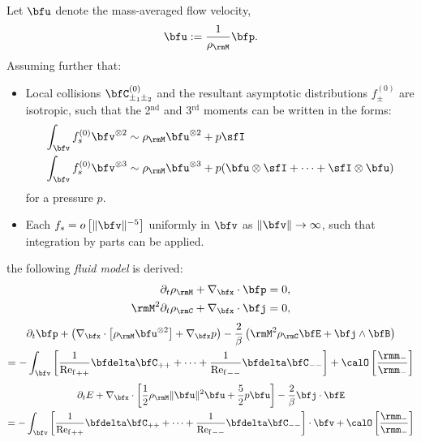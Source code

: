     Let $\bfu$ denote the mass-averaged flow velocity,
    \begin{equation}
        \bfu  :=  \frac{1}{\rho_{\rmM}}\bfp.
    \end{equation}
    Assuming further that:
    \begin{itemize}
        \item  Local collisions $\bfC_{\pm_{1}\pm_{2}}^{(0)}$ and the resultant asymptotic distributions $f_{\pm}^{(0)}$ are isotropic, such that the 2$^{\text{nd}}$ and 3$^{\text{rd}}$ moments can be written in the forms:
        \begin{align}
            \int_{\bfv}f_{s}^{(0)}\bfv^{\otimes 2}  &\sim  \rho_{\rmM}\bfu^{\otimes 2} + p\sfI  \label{eqn:isotropic 2nd moment}  \\
            \int_{\bfv}f_{s}^{(0)}\bfv^{\otimes 3}  &\sim  \rho_{\rmM}\bfu^{\otimes 3} + p(\bfu\otimes\sfI + \cdots + \sfI\otimes\bfu)  \label{eqn:isotropic 3rd moment}
        \end{align}
        for a pressure $p$. 
        \item  Each $f_{s}  =  o\left[\|\bfv\|^{- 5}\right]$ uniformly in $\bfv$ as $\|\bfv\|  \rightarrow  \infty$, such that integration by parts can be applied.
    \end{itemize}
    the following \emph{fluid model} is derived:
    \begin{align}
        \partial_{t}\rho_{\rmM} + \nabla_{\bfx}\cdot\bfp  &=  0,  \\
        \rmM^{2}\partial_{t}\rho_{\rmC} + \nabla_{\bfx}\cdot\bfj  &=  0,
    \end{align}
    \vspace{-25pt}
    \begin{multline}
        \partial_{t}\bfp + \left(\nabla_{\bfx}\cdot\left[\rho_{\rmM}\bfu^{\otimes 2}\right] + \nabla_{\bfx}p\right) - \frac{2}{\beta}\left(\rmM^{2}\rho_{\rmC}\bfE + \bfj\wedge\bfB\right)  \\
        =  - \int_{\bfv}\left[\frac{1}{{\rmRef}_{++}}\bfdelta\bfC_{++} + \cdots + \frac{1}{{\rmRef}_{--}}\bfdelta\bfC_{--}\right] + \calO\left[\frac{\rmm_{-}}{\rmm_{-}}\right]
    \end{multline}
    \vspace{-15pt}
    \begin{multline}
        \partial_{t}E + \nabla_{\bfx}\cdot\left[\frac{1}{2}\rho_{\rmM}\|\bfu\|^{2}\bfu + \frac{5}{2}p\bfu\right] - \frac{2}{\beta}\bfj\cdot\bfE  \\
        =  - \int_{\bfv}\left[\frac{1}{{\rmRef}_{++}}\bfdelta\bfC_{++} + \cdots + \frac{1}{{\rmRef}_{--}}\bfdelta\bfC_{--}\right]\cdot\bfv + \calO\left[\frac{\rmm_{-}}{\rmm_{-}}\right]
    \end{multline}
